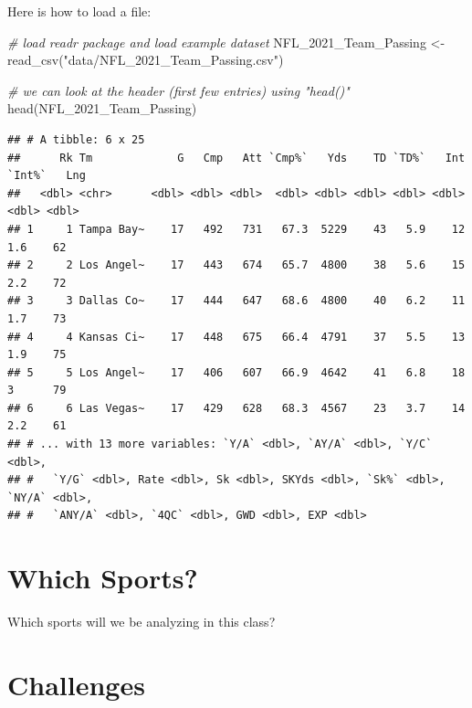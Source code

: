 \documentclass[
  11pt,
]{book}
\newenvironment{Shaded}{\begin{snugshade}}{\end{snugshade}}
\newcommand{\CommentTok}[1]{\textcolor[rgb]{0.56,0.35,0.01}{\textit{#1}}}
\newcommand{\FunctionTok}[1]{\textcolor[rgb]{0.00,0.00,0.00}{#1}}
\newcommand{\NormalTok}[1]{#1}
\newcommand{\OtherTok}[1]{\textcolor[rgb]{0.56,0.35,0.01}{#1}}
\newcommand{\StringTok}[1]{\textcolor[rgb]{0.31,0.60,0.02}{#1}}
\theoremstyle{definition}
\theoremstyle{definition}
\theoremstyle{definition}
\theoremstyle{definition}
\theoremstyle{remark}
\begin{document}
\newpage

Here is how to load a file:

\begin{Shaded}
\begin{Highlighting}[]
\CommentTok{\# load readr package and load example dataset}
\NormalTok{NFL\_2021\_Team\_Passing }\OtherTok{\textless{}{-}} \FunctionTok{read\_csv}\NormalTok{(}\StringTok{"data/NFL\_2021\_Team\_Passing.csv"}\NormalTok{)}

\CommentTok{\# we can look at the header (first few entries) using "head()"}
\FunctionTok{head}\NormalTok{(NFL\_2021\_Team\_Passing)}
\end{Highlighting}
\end{Shaded}

\begin{verbatim}
## # A tibble: 6 x 25
##      Rk Tm             G   Cmp   Att `Cmp%`   Yds    TD `TD%`   Int `Int%`   Lng
##   <dbl> <chr>      <dbl> <dbl> <dbl>  <dbl> <dbl> <dbl> <dbl> <dbl>  <dbl> <dbl>
## 1     1 Tampa Bay~    17   492   731   67.3  5229    43   5.9    12    1.6    62
## 2     2 Los Angel~    17   443   674   65.7  4800    38   5.6    15    2.2    72
## 3     3 Dallas Co~    17   444   647   68.6  4800    40   6.2    11    1.7    73
## 4     4 Kansas Ci~    17   448   675   66.4  4791    37   5.5    13    1.9    75
## 5     5 Los Angel~    17   406   607   66.9  4642    41   6.8    18    3      79
## 6     6 Las Vegas~    17   429   628   68.3  4567    23   3.7    14    2.2    61
## # ... with 13 more variables: `Y/A` <dbl>, `AY/A` <dbl>, `Y/C` <dbl>,
## #   `Y/G` <dbl>, Rate <dbl>, Sk <dbl>, SKYds <dbl>, `Sk%` <dbl>, `NY/A` <dbl>,
## #   `ANY/A` <dbl>, `4QC` <dbl>, GWD <dbl>, EXP <dbl>
\end{verbatim}

\newpage

\hypertarget{which-sports}{%
\section*{Which Sports?}\label{which-sports}}

Which sports will we be analyzing in this class?

\vfill

\hypertarget{challenges}{%
\section*{Challenges}\label{challenges}}
\end{document}
